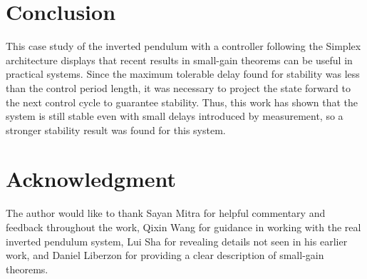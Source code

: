 \documentclass[conference]{IEEEtran}
\begin{document}
\section{Conclusion}
This case study of the inverted pendulum with a controller following the Simplex architecture displays that recent results in small-gain theorems can be useful in practical systems.  Since the maximum tolerable delay found for stability was less than the control period length, it was necessary to project the state forward to the next control cycle to guarantee stability.  Thus, this work has shown that the system is still stable even with small delays introduced by measurement, so a stronger stability result was found for this system.

\section*{Acknowledgment}
The author would like to thank Sayan Mitra for helpful commentary and feedback throughout the work, Qixin Wang for guidance in working with the real inverted pendulum system, Lui Sha for revealing details not seen in his earlier work, and Daniel Liberzon for providing a clear description of small-gain theorems.






%






\end{document}
